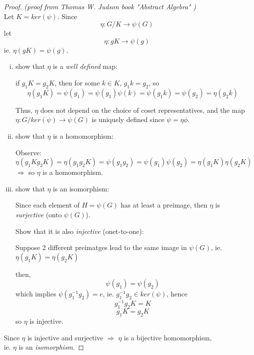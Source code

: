 \documentclass{article}
\theoremstyle{definition}
\begin{document}
\begin{proof}
  \emph{(proof from Thomas W. Judson book "Abstract Algebra" \cite{judson})}\\

  Let $K=ker(\psi)$.
  Since
  $$\eta: G/K \longrightarrow \psi(G)$$
  let
  $$\eta: gK \longrightarrow \psi(g)$$
  ie. $\eta(gK)=\psi(g)$.

  \begin{enumerate}[i.]
    \item show that $\eta$ is a \emph{well defined} map:

      if $g_1 K=g_2 K$, then for some $k \in K$, $g_1 k =g_2$, so
      $$\eta(g_1K)=\psi(g_1) = \psi(g_1)\psi(k) = \psi(g_1 k) = \psi(g_2) = \eta(g_2 k)$$

      Thus, $\eta$ does not depend on the choice of coset representatives, and
      the map $\eta: G/ker(\psi) \longrightarrow \psi(G)$ is uniquely defined
      since $\psi=\eta\phi$.

    \item show that $\eta$ is a homomorphism:

      Observe:
      $$\eta(g_1 K g_2 K) = \eta(g_1 g_2 K) = \psi(g_1 g_2) = \psi(g_1) \psi(g_2) = \eta(g_1 K) \eta(g_2 K)$$
      $\Longrightarrow$ so $\eta$ is a homomorphism.

    \item show that $\eta$ is an isomorphism:

      Since each element of $H=\psi(G)$ has at least a preimage, then $\eta$ is \emph{surjective} (onto $\psi(G)$).

      Show that it is also \emph{injective} (onet-to-one):
      
      Suppose 2 different preimatges lead to the same image in $\psi(G)$, ie.
      $\eta(g_1 K) = \eta(g_2 K)$

      then,
      $$\psi(g_1) = \psi(g_2)$$
      which implies $\psi(g_1^{-1} g_2) = e$, ie. $g_1^{-1} g_2 \in ker(\psi)$,
      hence
      $$g_1^{-1} g_2 K = K$$
      $$g_1 K = g_2 K$$
      so $\eta$ is injective.
  \end{enumerate}

  Since $\eta$ is injective and surjective $\Longrightarrow$ $\eta$ is a bijective homomorphism,\\
  ie. $\eta$ is an \emph{isomorphism}.
\end{proof}
\end{document}
